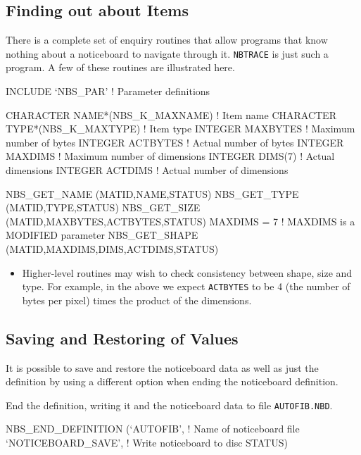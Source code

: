 \documentclass[twoside,11pt,nolof]{starlink}
\begin{document}
\subsection {Finding out about Items}

There is a complete set of enquiry routines that allow programs that know
nothing about a noticeboard to navigate through it. \texttt{NBTRACE} is just such a
program. A few of these routines are illustrated here.

\begin{terminalv}
INCLUDE   `NBS_PAR'               ! Parameter definitions

CHARACTER NAME*(NBS_K_MAXNAME)    ! Item name
CHARACTER TYPE*(NBS_K_MAXTYPE)    ! Item type
INTEGER   MAXBYTES                ! Maximum number of bytes
INTEGER   ACTBYTES                ! Actual number of bytes
INTEGER   MAXDIMS                 ! Maximum number of dimensions
INTEGER   DIMS(7)                 ! Actual dimensions
INTEGER   ACTDIMS                 ! Actual number of dimensions

NBS_GET_NAME  (MATID,NAME,STATUS)
NBS_GET_TYPE  (MATID,TYPE,STATUS)
NBS_GET_SIZE  (MATID,MAXBYTES,ACTBYTES,STATUS)
MAXDIMS = 7                       ! MAXDIMS is a MODIFIED parameter
NBS_GET_SHAPE (MATID,MAXDIMS,DIMS,ACTDIMS,STATUS)
\end{terminalv}

\begin {itemize}
\item Higher-level routines may wish to check consistency between shape, size
and type. For example, in the above we expect \texttt{ACTBYTES} to be 4 (the number
of bytes per pixel) times the product of the dimensions.
\end {itemize}

\subsection {Saving and Restoring of Values}
\label {Saving and Restoring of Values}

It is possible to save and restore the noticeboard data as well as just the
definition by using a different option when ending the noticeboard definition.

End the definition, writing it and the noticeboard data to file \texttt{AUTOFIB.NBD}.

\begin{terminalv}
NBS_END_DEFINITION   (`AUTOFIB',          ! Name of noticeboard file
                      `NOTICEBOARD_SAVE', ! Write noticeboard to disc
                      STATUS)
\end{terminalv}
\end{document}
